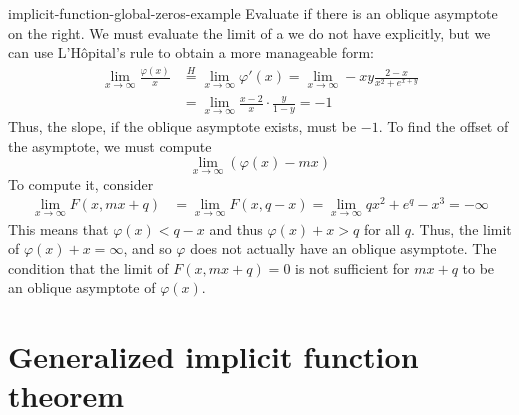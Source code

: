 \documentclass[preview]{standalone}
\begin{document}
\begin{snippetexample}{implicit-function-global-zeros-example}{}
    Evaluate if there is an oblique asymptote on the right.
    We must evaluate the limit of a \function we do not have explicitly,
    but we can use L'Hôpital's rule to obtain a more manageable form:
    \begin{align*}
        \lim_{x \to \infty} \frac{\varphi(x)}{x}
        &\overset{H}{=} \lim_{x \to \infty} \varphi'(x)
        = \lim_{x \to \infty} -xy \frac{2-x}{x^2 + e^{x+y}} \\
        &= \lim_{x \to \infty} \frac{x-2}{x} \cdot \frac{y}{1 - y} = -1
    \end{align*}
    Thus, the slope, if the oblique asymptote exists, must be \(-1\).
    To find the offset of the asymptote, we must compute
    \[
        \lim_{x \to \infty} (\varphi(x) - mx)
    \]
    To compute it, consider
    \begin{align*}
        \lim_{x \to \infty} F(x, mx + q)
        &= \lim_{x \to \infty} F(x, q - x)
        = \lim_{x \to \infty} qx^2 + e^q - x^3 = -\infty
    \end{align*}
    This means that \(\varphi(x) < q - x\) and thus \(\varphi(x) + x > q\) for all \(q\).
    Thus, the limit of \(\varphi(x) + x = \infty\), and so \(\varphi\)
    does not actually have an oblique asymptote.
    The condition that the limit of \(F(x, mx+q) = 0\)
    is not sufficient for \(mx+q\) to be an oblique asymptote of \(\varphi(x)\).
\end{snippetexample}

\section{Generalized implicit function theorem}
\end{document}
